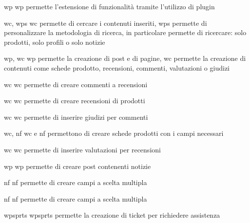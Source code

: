 
{\acrlong{wp}}
{\acrlong{wp} permette l'estensione di funzionalità tramite l'utilizzo di plugin}


{\acrlong{wc}, \acrlong{wps}}
{\acrlong{wc} permette di cercare i contenuti inseriti, \acrlong{wps} permette di personalizzare la metodologia di ricerca, in particolare permette di ricercare: solo prodotti, solo profili o solo notizie}


{\acrlong{wp}, \acrlong{wc}}
{\acrlong{wp} permette la creazione di post e di pagine, \acrlong{wc} permette la creazione di contenuti come schede prodotto, recensioni, commenti, valutazioni o giudizi}


{\acrlong{wc}}
{\acrlong{wc} permette di creare commenti a recensioni}


{\acrlong{wc}}
{\acrlong{wc} permette di creare recensioni di prodotti}


{\acrlong{wc}}
{\acrlong{wc} permette di inserire giudizi per commenti}


{\acrlong{wc}, \acrlong{nf}}
{\acrlong{wc} e \acrlong{nf} permettono di creare schede prodotti con i campi necessari}


{\acrlong{wc}}
{\acrlong{wc} permette di inserire valutazioni per recensioni}


{\acrlong{wp}}
{\acrlong{wp} permette di creare post contenenti notizie}


{\acrlong{nf}}
{\acrlong{nf} permette di creare campi a scelta multipla}


{\acrlong{nf}}
{\acrlong{nf} permette di creare campi a scelta multipla}


{\acrlong{wpsprts}}
{\acrlong{wpsprts} permette la creazione di ticket per richiedere assistenza}

